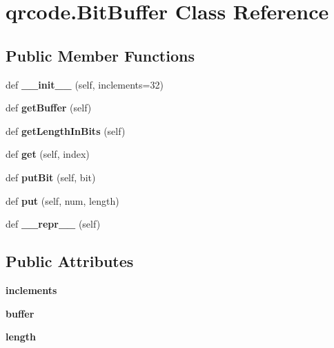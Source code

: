 \hypertarget{classqrcode_1_1_bit_buffer}{}\section{qrcode.\+Bit\+Buffer Class Reference}
\label{classqrcode_1_1_bit_buffer}
\subsection*{Public Member Functions}
\begin{DoxyCompactItemize}
\item 
\mbox{\label{classqrcode_1_1_bit_buffer_afd1311ac1db1db06c4e53e420710949d}} 
def {\bfseries \+\_\+\+\_\+init\+\_\+\+\_\+} (self, inclements=32)
\item 
\mbox{\label{classqrcode_1_1_bit_buffer_a0694bb47f335fe07c06ca1b473ff5880}} 
def {\bfseries get\+Buffer} (self)
\item 
\mbox{\label{classqrcode_1_1_bit_buffer_afff4541bf7bcb67b9af830ab5bfa2b15}} 
def {\bfseries get\+Length\+In\+Bits} (self)
\item 
\mbox{\label{classqrcode_1_1_bit_buffer_ad840db20ad36e891f949a0774aedd279}} 
def {\bfseries get} (self, index)
\item 
\mbox{\label{classqrcode_1_1_bit_buffer_aca9226f4ea417c1f7e2f25b6ad3dd029}} 
def {\bfseries put\+Bit} (self, bit)
\item 
\mbox{\label{classqrcode_1_1_bit_buffer_a8ce5430e182496c923b4c9cc1f8c640d}} 
def {\bfseries put} (self, num, length)
\item 
\mbox{\label{classqrcode_1_1_bit_buffer_a806226ce574a61b80bdc164e5eda9f75}} 
def {\bfseries \+\_\+\+\_\+repr\+\_\+\+\_\+} (self)
\end{DoxyCompactItemize}
\subsection*{Public Attributes}
\begin{DoxyCompactItemize}
\item 
\mbox{\label{classqrcode_1_1_bit_buffer_a5616f5eae04256c0fa82eb2772dfcf6f}} 
{\bfseries inclements}
\item 
\mbox{\label{classqrcode_1_1_bit_buffer_a341a7ff9ae2d87d00734fd0fb977939f}} 
{\bfseries buffer}
\item 
\mbox{\label{classqrcode_1_1_bit_buffer_a4d2b6b573cd1bc9beedb5092244fa76b}} 
{\bfseries length}
\end{DoxyCompactItemize}



